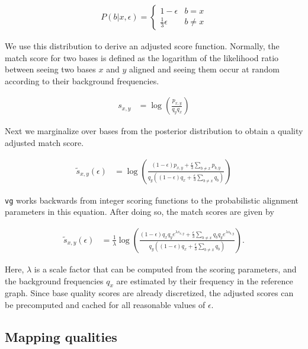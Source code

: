 \documentclass[a4paper,12pt,numbered,oneside]{Classes/PhDThesisPSnPDF}
\providecommand{\DIFaddbegin}{} %
\providecommand{\DIFaddend}{} %
\begin{document}
\begin{align}
    P(b|x, \epsilon) = \begin{cases}
        1 - \epsilon & b = x \\
        \frac{1}{3} \epsilon & b \neq x
    \end{cases}
\end{align}

We use this distribution to derive an adjusted score function. Normally, the match score for two bases is defined as the logarithm of the likelihood ratio between seeing two bases $x$ and $y$ aligned and seeing them occur at random according to their background frequencies. 

\begin{align}
    s_{x,y} &= \log\left(\frac{p_{x,y}}{q_y q_x} \right) \label{eqn:base_score}
\end{align}

Next we marginalize over bases from the posterior distribution to obtain a quality adjusted match score.

\begin{align}
    \tilde s_{x,y}(\epsilon) &= \log\left(\frac{(1 - \epsilon)p_{x,y} + \frac{\epsilon}{3}\sum_{b \neq x}p_{b, y}}{q_y\left((1 - \epsilon)q_x + \frac{\epsilon}{3}\sum_{b \neq x}q_b \right)} \right)
\end{align}

{\tt vg} works backwards from integer scoring functions to the probabilistic alignment parameters in this equation. After doing so, the match scores are given by

\begin{align}
    \tilde s_{x,y}(\epsilon) &= \frac{1}{\lambda} \log\left(\frac{(1 - \epsilon)q_x q_y e^{\lambda s_{x,y}} + \frac{\epsilon}{3}\sum_{b \neq x}q_b q_y e^{\lambda s_{b,y}}}{q_y\left((1 - \epsilon)q_x + \frac{\epsilon}{3}\sum_{b \neq x}q_b \right)} \right).
\end{align}

Here, $\lambda$ is a scale factor that can be computed from the scoring parameters, and the background frequencies $q_x$ are estimated by their frequency in the reference graph. Since base quality scores are already discretized, the adjusted scores can be precomputed and cached for all reasonable values of $\epsilon$. 

\subsection{Mapping qualities}
\DIFaddbegin \label{sec:mapping_quality}
\DIFaddend 
\end{document}
